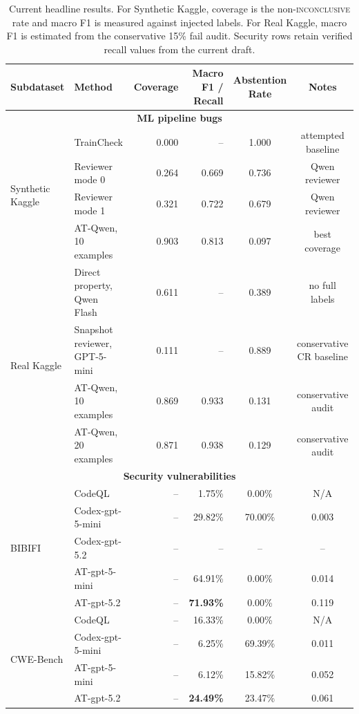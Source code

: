 \documentclass{article}
\theoremstyle{plain}
\theoremstyle{definition}
\theoremstyle{remark}
\begin{document}
\begin{table}[t]
  \centering
  \caption{Current headline results. For Synthetic Kaggle, coverage is the non-\textsc{inconclusive} rate and macro F1 is measured against injected labels. For Real Kaggle, macro F1 is estimated from the conservative 15\% fail audit. Security rows retain verified recall values from the current draft.}
  \label{tab:rq1}
  \begin{tabular}{llrrcc}
    \toprule
    Subdataset & Method & Coverage & Macro F1 / Recall & Abstention Rate & Notes \\
    \midrule
    \multicolumn{6}{c}{\textbf{ML pipeline bugs}} \\
    \multirow{4}{*}{Synthetic Kaggle}
      & TrainCheck & 0.000 & -- & 1.000 & attempted baseline \\
      & Reviewer mode 0 & 0.264 & 0.669 & 0.736 & Qwen reviewer \\
      & Reviewer mode 1 & 0.321 & 0.722 & 0.679 & Qwen reviewer \\
      & AT-Qwen, 10 examples & 0.903 & 0.813 & 0.097 & best coverage \\
    \midrule
    \multirow{4}{*}{Real Kaggle}
      & Direct property, Qwen Flash & 0.611 & -- & 0.389 & no full labels \\
      & Snapshot reviewer, GPT-5-mini & 0.111 & -- & 0.889 & conservative CR baseline \\
      & AT-Qwen, 10 examples & 0.869 & 0.933 & 0.131 & conservative audit \\
      & AT-Qwen, 20 examples & 0.871 & 0.938 & 0.129 & conservative audit \\
    \midrule
    \multicolumn{6}{c}{\textbf{Security vulnerabilities}} \\
    \multirow{5}{*}{BIBIFI}
      & CodeQL & -- & 1.75\% & 0.00\% & N/A \\
      & Codex-gpt-5-mini & -- & 29.82\% & 70.00\% & 0.003 \\
      & Codex-gpt-5.2 & -- & -- & -- & -- \\
      & AT-gpt-5-mini & -- & 64.91\% & 0.00\% & 0.014 \\
      & AT-gpt-5.2 & -- & \textbf{71.93\%} & 0.00\% & 0.119 \\
      \midrule
    \multirow{4}{*}{CWE-Bench}
      & CodeQL & -- & 16.33\% & 0.00\% & N/A \\
      & Codex-gpt-5-mini & -- & 6.25\% & 69.39\% & 0.011 \\
      & AT-gpt-5-mini & -- & 6.12\% & 15.82\% & 0.052 \\
      & AT-gpt-5.2 & -- & \textbf{24.49\%} & 23.47\% & 0.061 \\
    \bottomrule
  \end{tabular}
\end{table}
\end{document}
